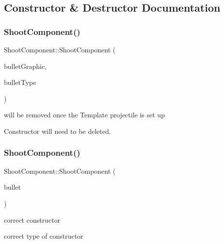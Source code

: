 \subsection{Constructor \& Destructor Documentation}
\mbox{\label{class_shoot_component_a3c0334d147d54522d58a379d6e473006}} 
\subsubsection{\texorpdfstring{Shoot\+Component()}{ShootComponent()}\hspace{0.1cm}{\footnotesize\ttfamily [1/2]}}
{\footnotesize\ttfamily Shoot\+Component\+::\+Shoot\+Component (\begin{DoxyParamCaption}\item[{const std\+::shared\+\_\+ptr$<$ \hyperlink{class_graphic_object}{Graphic\+Object} $>$ \&}]{bullet\+Graphic,  }\item[{Game\+Object\+Type}]{bullet\+Type }\end{DoxyParamCaption})}



will be removed once the Template projectile is set up 

Constructor will need to be deleted. \mbox{\label{class_shoot_component_a38ab688c7cf0775b4f15124a1c02bfc7}} 
\subsubsection{\texorpdfstring{Shoot\+Component()}{ShootComponent()}\hspace{0.1cm}{\footnotesize\ttfamily [2/2]}}
{\footnotesize\ttfamily Shoot\+Component\+::\+Shoot\+Component (\begin{DoxyParamCaption}\item[{std\+::shared\+\_\+ptr$<$ \hyperlink{class_projectile}{Projectile} $>$}]{bullet }\end{DoxyParamCaption})}



correct constructor 

correct type of constructor 

